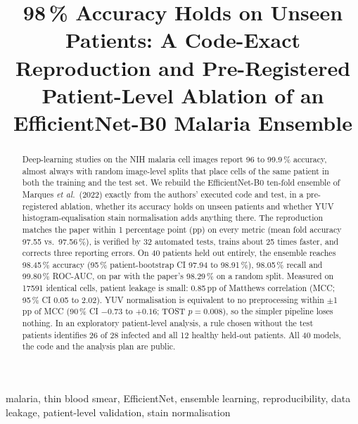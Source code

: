 \documentclass[conference]{IEEEtran}
\begin{document}
\title{98\,\% Accuracy Holds on Unseen Patients: A Code-Exact Reproduction and Pre-Registered Patient-Level Ablation of an EfficientNet-B0 Malaria Ensemble}

\author{
}

\maketitle

\begin{abstract}
Deep-learning studies on the NIH malaria cell images report 96 to 99.9\,\% accuracy, almost always with random image-level splits that place cells of the same patient in both the training and the test set. We rebuild the EfficientNet-B0 ten-fold ensemble of Marques \emph{et al.}\ (2022) exactly from the authors' executed code and test, in a pre-registered ablation, whether its accuracy holds on unseen patients and whether YUV histogram-equalisation stain normalisation adds anything there.
The reproduction matches the paper within 1 percentage point (pp) on every metric (mean fold accuracy 97.55 vs.\ 97.56\,\%), is verified by 32 automated tests, trains about 25 times faster, and corrects three reporting errors.
On 40 patients held out entirely, the ensemble reaches 98.45\,\% accuracy (95\,\% patient-bootstrap CI 97.94 to 98.91\,\%), 98.05\,\% recall and 99.80\,\% ROC-AUC, on par with the paper's 98.29\,\% on a random split. Measured on \num{17591} identical cells, patient leakage is small: 0.85\,pp of Matthews correlation (MCC; 95\,\% CI 0.05 to 2.02).
YUV normalisation is equivalent to no preprocessing within $\pm$1\,pp of MCC (90\,\% CI $-0.73$ to $+0.16$; TOST $p=0.008$), so the simpler pipeline loses nothing. In an exploratory patient-level analysis, a rule chosen without the test patients identifies 26 of 28 infected and all 12 healthy held-out patients. All 40 models, the code and the analysis plan are public.
\end{abstract}

\begin{IEEEkeywords}
malaria, thin blood smear, EfficientNet, ensemble learning, reproducibility, data leakage, patient-level validation, stain normalisation
\end{IEEEkeywords}
\end{document}

